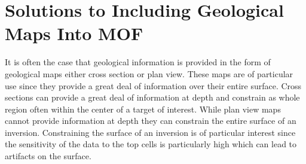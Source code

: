 
\chapter{Solutions to Including Geological Maps Into \ac{MOF}}
\label{ch:GIFtools}
%
%
%
%
%
%
%
%	
%
%
%

It is often the case that geological information is provided in the form of geological maps either cross section or plan view. These maps are of particular use since they provide a great deal of information over their entire surface. Cross sections can provide a great deal of information at depth and constrain as whole region often within the center of a target of interest. While plan view maps cannot provide information at depth they can constrain the entire surface of an inversion.  Constraining the surface of an inversion is of particular interest since the sensitivity of the data to the top cells is particularly high which can lead to artifacts on the surface.

